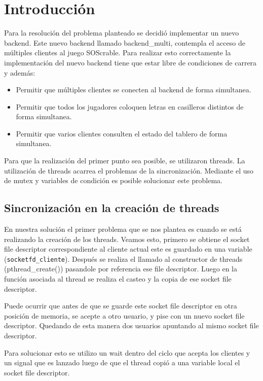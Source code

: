 \section{Introducci\'on}

Para la resoluci\'on del problema planteado se decidi\'o implementar un nuevo backend. Este nuevo backend llamado backend\_multi, contempla el acceso de m\'ultiples clientes al juego SOScrable. Para realizar esto correctamente la implementaci\'on del nuevo backend tiene que estar libre de condiciones de carrera y adem\'as:
\begin{itemize}
 \item Permitir que m\'ultiples clientes se conecten al backend de forma simultanea.
 \item Permitir que todos los jugadores coloquen letras en casilleros distintos de forma simultanea.
 \item Permitir que varios clientes consulten el estado del tablero de forma simultanea.
\end{itemize}

Para que la realizaci\'on del primer punto sea posible, se utilizaron threads. La utilizaci\'on de threads acarrea el problemas de la sincronizaci\'on. Mediante el uso de mutex y variables de condici\'on es posible solucionar este problema. 

\subsection{Sincronizaci\'on en la creaci\'on de threads}

En nuestra soluci\'on el primer problema que se nos plantea es cuando se est\'a realizando la creaci\'on de los threads. Veamos esto, primero se obtiene el socket file descriptor correspondiente al cliente actual este es guardado en una variable (\verb|socketfd_cliente|). Despu\'es se realiza el llamado al constructor de threads (pthread\_create()) pasandole por referencia ese file descriptor. Luego en la funci\'on asociada al thread se realiza el casteo y la copia de ese socket file descriptor.

Puede ocurrir que antes de que se guarde este socket file descriptor en otra posici\'on de memoria, se acepte a otro usuario, y pise con un nuevo socket file descriptor. Quedando de esta manera dos usuarios apuntando al mismo socket file descriptor. 

Para solucionar esto se utilizo un wait dentro del ciclo que acepta los clientes y un signal que es lanzado luego de que el thread copi\'o a una variable local el socket file descriptor. 

